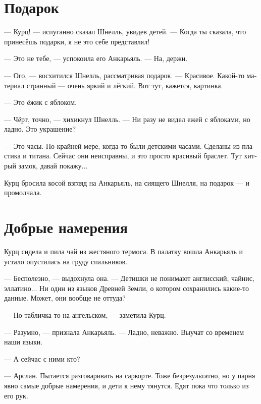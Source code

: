 \documentclass[a4paper,10pt,fleqn]{book}\usepackage{polyglossia}\setdefaultlanguage[babelshorthands=true]{russian}\setotherlanguage{english}\defaultfontfeatures{Ligatures=TeX,Mapping=tex-text}\usepackage{xcolor}\newcommand{\ml}[3]{#2}
\begin{document}
\section{Подарок}

--- Курц! --- испуганно сказал Шнелль, увидев детей.
--- Когда ты сказала, что принесёшь подарки, я не это себе представлял!

--- Это не тебе, --- успокоила его Анкарьяль.
--- На, держи.

--- Ого, --- восхитился Шнелль, рассматривая подарок.
--- Красивое.
Какой-то материал странный --- очень яркий и лёгкий.
Вот тут, кажется, картинка.

--- Это ёжик с яблоком.

--- Чёрт, точно, --- хихикнул Шнелль.
--- Ни разу не видел ежей с яблоками, но ладно.
Это украшение?

--- Это часы.
По крайней мере, когда-то были детскими часами.
Сделаны из пластика и титана.
Сейчас они неисправны, и это просто красивый браслет.
Тут хитрый замок, давай покажу...

Курц бросила косой взгляд на Анкарьяль, на сиящего Шнелля, на подарок --- и промолчала.

\section{Добрые намерения}

Курц сидела и пила чай из жестяного термоса.
В палатку вошла Анкарьяль и устало опустилась на груду спальников.

--- Бесполезно, --- выдохнула она.
\ml{$0$}
{--- Детишки не понимают англисский, чайнис, эллатино...}
{``The children don't speak Englis, Chainis, Ellatino ....}
Ни один из языков Древней Земли, о котором сохранились какие-то данные.
Может, они вообще не оттуда?

\ml{$0$}
{--- Но табличка-то на ангельском, --- заметила Курц.}
{``But that plate is written in Engels,'' Kurz noted.}

\ml{$0$}
{--- Разумно, --- признала Анкарьяль.}
{``Makes sense,'' Angaralle admitted.}
--- Ладно, неважно.
Выучат со временем наши языки.

--- А сейчас с ними кто?

\ml{$0$}
{--- Арслан.}
{``Arslan.}
\ml{$0$}
{Пытается разговаривать на саркорте.}
{Trying to speak Sarqort to them.}
\ml{$0$}
{Тоже безрезультатно, но у парня явно самые добрые намерения, и дети к нему тянутся.}
{Result is the same, but the guy apparently has the best intentions for them, and the children reciprocate.}
\ml{$0$}
{Едят пока что только из его рук.}
{Thus far, they take food from his hands only.''}
\end{document}
